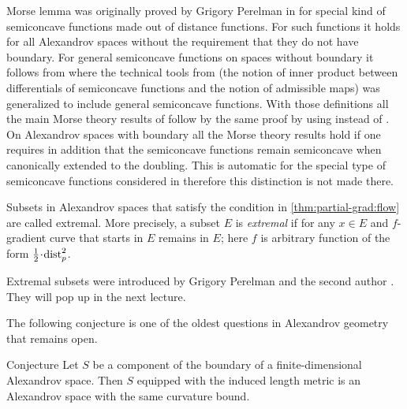Morse lemma was originally proved by Grigory Perelman in \cite{perelman1993} for special kind of semiconcave functions made out of distance functions.
For such functions it holds for all Alexandrov spaces without the requirement that they do not have boundary.
For general semiconcave functions on spaces without boundary it follows from \cite{perelman1994} where the technical tools from \cite{perelman1993} (the notion of inner product between differentials of semiconcave functions and the notion of admissible maps) was generalized to include general semiconcave functions. With those definitions all the main Morse theory results of \cite{perelman1993} follow by the same proof by using  \cite[2.2]{perelman1994} instead of \cite[Lemma 1]{perelman1993}.
On Alexandrov spaces with boundary all the Morse theory results hold if one requires in addition that the semiconcave functions remain semiconcave when canonically extended to the doubling.
This is automatic for the special type of semiconcave functions considered in \cite{perelman1993} therefore this distinction is not made there.

Subsets in Alexandrov spaces that satisfy the condition in \ref{thm:partial-grad:flow} are called extremal.
More precisely, a subset $E$ is \emph{extremal} if for any $x\in E$
and $f$-gradient curve that starts in $E$ remains in $E$;
here $f$ is arbitrary function of the form $\tfrac12\cdot \distfun_p^2$. %

Extremal subsets were introduced by Grigory Perelman and the second author \cite{perelman-petrunin}.
They will pop up in the next lecture.

The following conjecture is one of the oldest questions in Alexandrov geometry that remains open.

\begin{thm}{Conjecture}\label{conj:bry}
Let $S$ be a component of the boundary of a finite-dimensional Alexandrov space.
Then $S$ equipped with the induced length metric is an Alexandrov space with the same curvature bound.
\end{thm}
